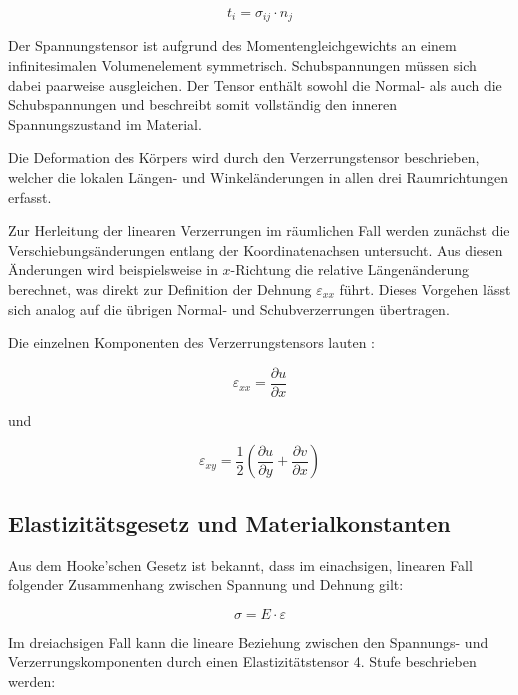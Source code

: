 	\begin{equation}
		t_i = 
		\sigma_{ij} \cdot n_j
	\end{equation}

Der Spannungstensor ist aufgrund des Momentengleichgewichts an einem infinitesimalen Volumenelement symmetrisch. Schubspannungen müssen sich dabei paarweise ausgleichen. 
Der Tensor enthält sowohl die Normal- als auch die Schubspannungen und beschreibt somit vollständig den inneren Spannungszustand im Material.

Die Deformation des Körpers wird durch den Verzerrungstensor beschrieben, welcher die lokalen Längen- und Winkeländerungen in allen drei Raumrichtungen erfasst.

Zur Herleitung der linearen Verzerrungen im räumlichen Fall werden zunächst die Verschiebungsänderungen entlang der Koordinatenachsen untersucht. 
Aus diesen Änderungen wird beispielsweise in $x$-Richtung die relative Längenänderung berechnet, was direkt zur Definition der Dehnung $\varepsilon_{xx}$ führt. 
Dieses Vorgehen lässt sich analog auf die übrigen Normal- und Schubverzerrungen übertragen.

Die einzelnen Komponenten des Verzerrungstensors lauten \cite{elastomechanik:Technische Mechanik 2:Elastostatik}:

	\begin{equation}
		\varepsilon_{xx} =
		\frac{\partial u}{\partial x}
	\end{equation}
	
	und
	
	\begin{equation}
		\varepsilon_{xy} =
		\frac{1}{2} \left( \frac{\partial u}{\partial y} + \frac{\partial v}{\partial x} \right)
	\end{equation}

\subsection{Elastizitätsgesetz und Materialkonstanten}
Aus dem Hooke’schen Gesetz ist bekannt, dass im einachsigen, linearen Fall folgender Zusammenhang zwischen Spannung und Dehnung gilt:

	\begin{equation}
		\sigma = 
		E \cdot \varepsilon
	\end{equation}

Im dreiachsigen Fall kann die lineare Beziehung zwischen den Spannungs- und Verzerrungskomponenten durch einen Elastizitätstensor 4. Stufe beschrieben werden:

